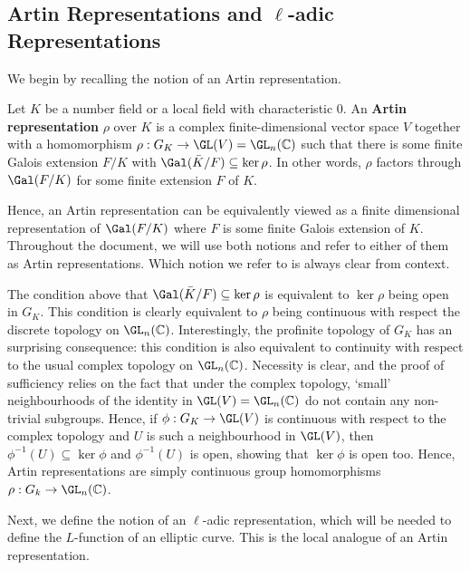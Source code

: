 \subsection{Artin Representations and  \texorpdfstring{$\ell$}{TEXT}-adic Representations} \label{subsection_reps}

We begin by recalling the notion of an Artin representation.

\begin{defn}
    Let $K$ be a number field or a local field with characteristic $0$. An \textbf{Artin representation} $\rho$ over $K$ is a complex finite-dimensional vector space $V$ together with a homomorphism $\rho:G_K\to\GL(V)=\GL_n(\CC)$ such that there is some finite Galois extension $F/K$ with $\Gal(\bar{K}/F)\subseteq\ker\rho$. In other words, $\rho$ factors through $\Gal(F/K)$ for some finite extension $F$ of $K$.
\end{defn}

Hence, an Artin representation can be equivalently viewed as a finite dimensional representation of $\Gal(F/K)$ where $F$ is some finite Galois extension of $K$. Throughout the document, we will use both notions and refer to either of them as Artin representations. Which notion we refer to is always clear from context.

\begin{rem}
    The condition above that $\Gal(\bar{K}/F)\subseteq\ker\rho$ is equivalent to $\ker\rho$ being open in $G_K$. This condition is clearly equivalent to $\rho$ being continuous with respect the discrete topology on $\GL_n(\CC)$. Interestingly, the profinite topology of $G_K$ has an surprising consequence: this condition is also equivalent to continuity with respect to the usual complex topology on $\GL_n(\CC)$. Necessity is clear, and the proof of sufficiency relies on the fact that under the complex topology, `small' neighbourhoods of the identity in $\GL(V)=\GL_n(\CC)$ do not contain any non-trivial subgroups. Hence, if $\phi:G_K\to\GL(V)$ is continuous with respect to the complex topology and $U$ is such a neighbourhood in $\GL(V)$, then $\phi^{-1}(U)\subseteq\ker\phi$ and $\phi^{-1}(U)$ is open, showing that $\ker\phi$ is open too. Hence, Artin representations are simply continuous group homomorphisms $\rho:G_k\to\GL_n(\CC)$.
\end{rem}

Next, we define the notion of an $\ell$-adic representation, which will be needed to define the $L$-function of an elliptic curve. This is the local analogue of an Artin representation.

